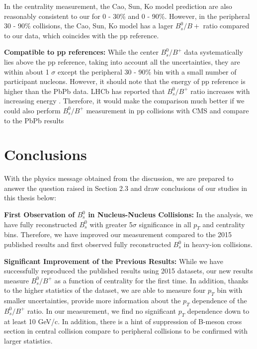 In the centrality measurement, the Cao, Sun, Ko model prediction are also reasonably consistent to our for 0 - 30\% and 0 - 90\%. However, in the peripheral 30 - 90\% collisions, the Cao, Sun, Ko model has a lager $B^0_s/B+$ ratio compared to our data, which coincides with the pp reference.  


\textbf{Compatible to pp references:} While the center $B^0_s/B^+$ data systematically lies above the pp reference, taking into account all the uncertainties, they are within about 1 $\sigma$ except the peripheral 30 - 90\% bin with a small number of participant nucleons. However, it should note that the energy of pp reference is higher than the PbPb data. LHCb has reported that $B^0_s/B^+$ ratio increases with increasing energy \cite{LHCbFF}. Therefore, it would make the comparison much better if we could also perform $B^0_s/B^+$ measurement in pp collisions with CMS and compare to the PbPb results



\section{Conclusions}


With the physics message obtained from the discussion, we are prepared to answer the question raised in Section 2.3 and draw conclusions of our studies in this thesis below:



\textbf{First Observation of $B^0_s$ in Nucleus-Nucleus Collisions:} In the analysis, we have fully reconstructed $B^0_s$ with greater 5$\sigma$ significance in all $p_T$ and centrality bins. Therefore, we have improved our measurement compared to the 2015 published results and first observed fully reconstructed $B^0_s$ in heavy-ion collisions.

\textbf{Significant Improvement of the Previous Results:} While we have successfully reproduced the published results using 2015 datasets, our new results measure $B^0_s/B^+$ as a function of centrality for the first time. In addition, thanks to the higher statistics of the dataset, we are able to measure four $p_T$ bin with smaller uncertainties, provide more information about the $p_T$ dependence of the $B^0_s/B^+$ ratio. In our measurement, we find no significant $p_T$ dependence down to at least 10 GeV/c. In addition, there is a hint of suppression of B-meson cross section in central collision compare to peripheral collisions to be confirmed with larger statistics. 
 
